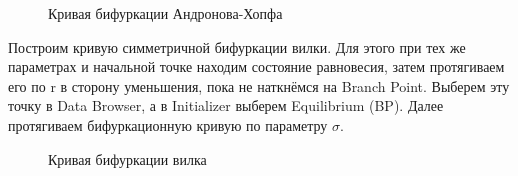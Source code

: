 \documentclass[12pt, a4paper]{article}
\begin{document}
\begin{figure}[H]
	\caption{Кривая бифуркации Андронова-Хопфа}
\end{figure}
Построим кривую симметричной бифуркации вилки.
\newline
Для этого при тех же параметрах и начальной точке находим состояние равновесия, затем протягиваем его по r в сторону уменьшения, пока не наткнёмся на Branch Point. Выберем эту точку в Data Browser, а в Initializer выберем Equilibrium (BP). Далее протягиваем бифуркационную кривую по параметру $\sigma$.
\begin{figure}[H]
	\caption{Кривая бифуркации вилка}
\end{figure}
\end{document}
